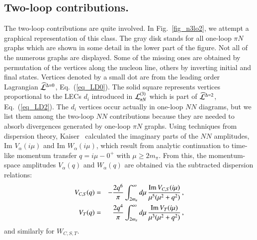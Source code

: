 \documentclass[sort&compress,preprint,3p]{elsarticle}
\begin{document}
\subsection{Two-loop contributions.}

The two-loop contributions are quite involved.
In Fig.~\ref{fig_n3lo2}, we attempt a graphical representation of
this class. The gray disk stands for all one-loop $\pi N$ graphs
which are shown in some detail in the lower part of the figure.
Not all of the numerous graphs are displayed. 
Some of the missing ones
are obtained by permutation of the vertices along the nucleon line,
others by inverting initial and final states.
Vertices denoted by a small dot are from the
leading order Lagrangian
$\widehat{\cal L}^{\Delta=0}$,
Eq.~(\protect\ref{eq_LD0}).
The solid square represents vertices proportional to the LECs
$d_i$ introduced in 
${\cal L}^{(3)}_{\pi N}$
which is part of
$\widehat{\cal L}^{\Delta=2}$,
Eq.~(\protect\ref{eq_LD2}).
The $d_i$ vertices occur actually in one-loop $NN$ diagrams, but
we list them among the two-loop $NN$ contributions because they
are needed to absorb divergences generated by 
one-loop $\pi N$ graphs.
Using techniques from dispersion theory,
Kaiser~\cite{Kai01a} calculated the imaginary parts of the
$NN$ amplitudes, Im $V_\alpha(i\mu)$ and Im $W_\alpha(i\mu)$,
which result from analytic continuation to time-like
momentum transfer $q=i\mu-0^+$ with $\mu\geq 2m_\pi$.
From this,
the momentum-space amplitudes $V_\alpha(q)$ and $W_\alpha(q)$
are obtained
via the subtracted dispersion relations:
\begin{eqnarray} 
V_{C,S}(q) &=& 
-{2 q^6 \over \pi} \int_{2m_\pi}^\infty d\mu \,
{{\rm Im\,}V_{C,S}(i \mu) \over \mu^5 (\mu^2+q^2) }\,, 
\\
V_T(q) &=& 
{2 q^4 \over \pi} \int_{2m_\pi}^\infty d\mu \,
{{\rm Im\,}V_T(i \mu) \over \mu^3 (\mu^2+q^2) }\,, 
\end{eqnarray}
and similarly for $W_{C,S,T}$.
\end{document}

